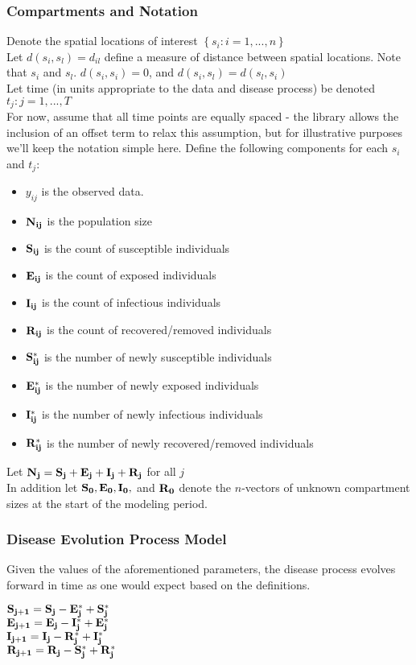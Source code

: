 \documentclass[12pt]{article}
\newcommand \mbreak {\\ \vspace{0.1in}}
\begin{document}
    \subsubsection{Compartments and Notation}
        Denote the spatial locations of interest $\left\{s_i : i = 1, ...,n \right\}$ \mbreak
        Let $d(s_i, s_l) = d_{il}$ define a measure of distance between 
        spatial locations. Note that $s_i$ and $s_l$. $d(s_i, s_i) = 0$, and $d(s_i, s_l) = d(s_l, s_i)$ \mbreak
        Let time (in units appropriate to the data and disease process) be denoted ${t_j : j = 1, ...,T}$ \mbreak
        For now, assume that all time points are equally spaced - the library allows the inclusion of an offset term 
        to relax this assumption, but for illustrative purposes we'll keep the notation simple here. 
        Define the following components for each $s_i$ and $t_j$: \mbreak

        \begin{itemize}
            \item {$y_{ij}$} is the observed data.
            \item {$\bf{N_{ij}}$} is the population size
            \item {$\bf{S_{ij}}$} is the count of susceptible individuals
            \item {$\bf{E_{ij}}$} is the count of exposed individuals
            \item {$\bf{I_{ij}}$} is the count of infectious individuals
            \item {$\bf{R_{ij}}$} is the count of recovered/removed individuals
            \item {$\bf{S^*_{ij}}$} is the number of newly susceptible individuals
            \item {$\bf{E^*_{ij}}$} is the number of newly exposed individuals
            \item {$\bf{I^*_{ij}}$} is the number of newly infectious individuals
            \item {$\bf{R^*_{ij}}$} is the number of newly recovered/removed individuals
        \end{itemize}
        Let {$\bf{N_j} = \bf{S_j + E_j + I_j + R_j}$} for all $j$\\
        In addition let ${\bf{S_0, E_0, I_0,}}$ and ${\bf{R_0}}$ denote the $n$-vectors of unknown compartment sizes at the 
        start of the modeling period. 
        

    \subsubsection{Disease Evolution Process Model}
    Given the values of the aforementioned parameters, the disease process evolves forward in time 
    as one would expect based on the definitions.  
    \begin{center}
        $\bf{S_{j+1}} = \bf{S_j} - \bf{E_j^*} + \bf{S_j^*}$\mbreak
        $\bf{E_{j+1}} = \bf{E_j} - \bf{I_j^*} + \bf{E_j^*}$\mbreak
        $\bf{I_{j+1}} = \bf{I_j} - \bf{R_j^*} + \bf{I_j^*}$\mbreak
        $\bf{R_{j+1}} = \bf{R_j} - \bf{S_j^*} + \bf{R_j^*}$\mbreak
    \end{center}
    \vspace{0.15in}
\end{document}

